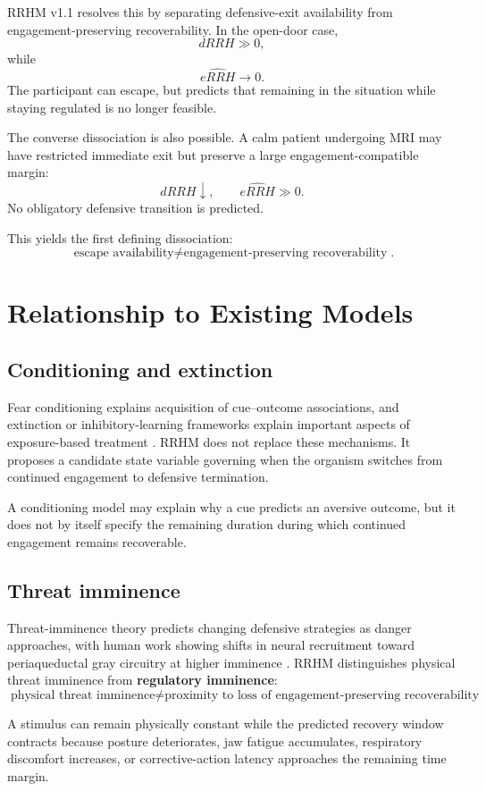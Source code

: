 \documentclass[11pt]{article}
\begin{document}
RRHM v1.1 resolves this by separating defensive-exit availability from engagement-preserving recoverability. In the open-door case,
\[
dRRH\gg0,
\]
while
\[
\widehat{eRRH}\rightarrow0.
\]
The participant can escape, but predicts that remaining in the situation while staying regulated is no longer feasible.

The converse dissociation is also possible. A calm patient undergoing MRI may have restricted immediate exit but preserve a large engagement-compatible margin:
\[
dRRH\downarrow,\qquad \widehat{eRRH}\gg0.
\]
No obligatory defensive transition is predicted.

This yields the first defining dissociation:
\[
\boxed{\text{escape availability}\neq\text{engagement-preserving recoverability}}.
\]

\section{Relationship to Existing Models}
\subsection{Conditioning and extinction}
Fear conditioning explains acquisition of cue--outcome associations, and extinction or inhibitory-learning frameworks explain important aspects of exposure-based treatment \cite{kausche2025,krypotos2015,pittig2018}. RRHM does not replace these mechanisms. It proposes a candidate state variable governing when the organism switches from continued engagement to defensive termination.

A conditioning model may explain why a cue predicts an aversive outcome, but it does not by itself specify the remaining duration during which continued engagement remains recoverable.

\subsection{Threat imminence}
Threat-imminence theory predicts changing defensive strategies as danger approaches, with human work showing shifts in neural recruitment toward periaqueductal gray circuitry at higher imminence \cite{mobbs2007}. RRHM distinguishes physical threat imminence from \textbf{regulatory imminence}:
\[
\boxed{\text{physical threat imminence}\neq\text{proximity to loss of engagement-preserving recoverability}}.
\]

A stimulus can remain physically constant while the predicted recovery window contracts because posture deteriorates, jaw fatigue accumulates, respiratory discomfort increases, or corrective-action latency approaches the remaining time margin.
\end{document}
